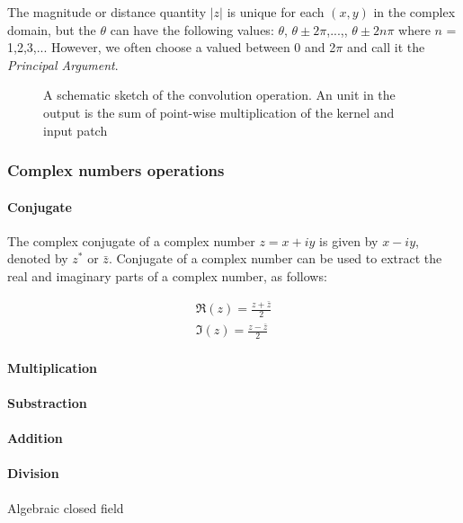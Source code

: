 The magnitude or distance quantity $|z|$ is unique for each $(x,y)$ in the complex domain, but the $\theta$ can have the following values: $\theta$, $\theta \pm \mathrm{2}\pi$,...,, $\theta \pm \mathrm{2}n\pi$ where $n$ = 1,2,3,... However, we often choose a valued between $0$ and 2$\pi$ and call it the \textit{Principal Argument}.

\begin{figure}[htb]
	\centering
	\epsfxsize=6cm
	{} 
	{}
	\caption{A schematic sketch of the convolution operation. An unit in the output is the sum of point-wise multiplication of the kernel and input patch \cite{bloggg}}
	\label{fig:conv}
\end{figure}

\subsubsection{Complex numbers operations}
\paragraph{Conjugate}
The complex conjugate of a complex number $z=x+iy$ is given by $x-iy$, denoted by $z^{*}$ or $\bar{z}$. Conjugate of a complex number can be used to extract the real and imaginary parts of a complex number, as follows:

\begin{equation}
\begin{aligned}
\Re(z)= \frac{z+\bar{z}}{2}\\
\Im(z)= \frac{z-\bar{z}}{2}
\end{aligned}
\end{equation}

\paragraph{Multiplication}


\paragraph{Substraction}
\paragraph{Addition}
\paragraph{Division}
Algebraic closed field


